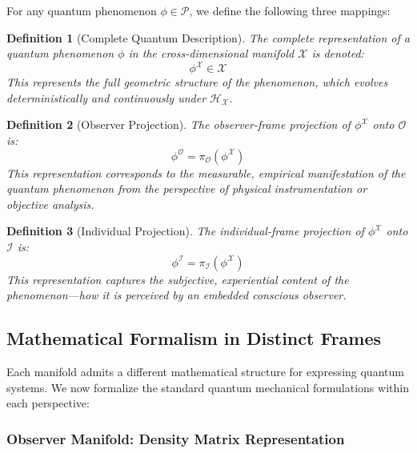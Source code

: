 \documentclass{article}
\newtheorem{definition}{Definition}
\begin{document}
For any quantum phenomenon $\phi \in \mathcal{P}$, we define the following three mappings:

\begin{definition}[Complete Quantum Description]
The complete representation of a quantum phenomenon $\phi$ in the cross-dimensional manifold $\mathcal{X}$ is denoted:
\begin{equation}
\phi^{\mathcal{X}} \in \mathcal{X}
\end{equation}
This represents the full geometric structure of the phenomenon, which evolves deterministically and continuously under $\mathcal{H}_\mathcal{X}$.
\end{definition}

\begin{definition}[Observer Projection]
The observer-frame projection of $\phi^{\mathcal{X}}$ onto $\mathcal{O}$ is:
\begin{equation}
\phi^{\mathcal{O}} = \pi_{\mathcal{O}}(\phi^{\mathcal{X}})
\end{equation}
This representation corresponds to the measurable, empirical manifestation of the quantum phenomenon from the perspective of physical instrumentation or objective analysis.
\end{definition}

\begin{definition}[Individual Projection]
The individual-frame projection of $\phi^{\mathcal{X}}$ onto $\mathcal{I}$ is:
\begin{equation}
\phi^{\mathcal{I}} = \pi_{\mathcal{I}}(\phi^{\mathcal{X}})
\end{equation}
This representation captures the subjective, experiential content of the phenomenon—how it is perceived by an embedded conscious observer.
\end{definition}

\subsection{Mathematical Formalism in Distinct Frames}

Each manifold admits a different mathematical structure for expressing quantum systems. We now formalize the standard quantum mechanical formulations within each perspective:

\subsubsection{Observer Manifold: Density Matrix Representation}
\end{document}

